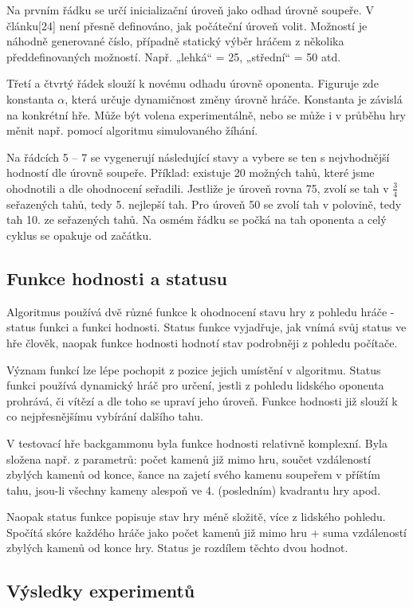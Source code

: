 Na prvním řádku se určí inicializační úroveň jako odhad úrovně soupeře. V článku[24] není přesně definováno, jak počáteční úroveň volit. Možností je náhodně generované číslo, případně statický výběr hráčem z několika předdefinovaných možností. Např. „lehká“ = 25, „střední“ = 50 atd.

Třetí a čtvrtý řádek slouží k novému odhadu úrovně oponenta. Figuruje zde konstanta $\alpha$, která určuje dynamičnost změny úrovně hráče. Konstanta je závislá na konkrétní hře. Může být volena experimentálně, nebo se může i v průběhu hry měnit např. pomocí algoritmu simulovaného žíhání.

Na řádcích 5 – 7 se vygenerují následující stavy a vybere se ten s nejvhodnější hodností dle úrovně soupeře. Příklad: existuje 20 možných tahů, které jsme ohodnotili a dle ohodnocení seřadili. Jestliže je úroveň rovna 75, zvolí se tah v $\frac{3}{4}$ seřazených tahů, tedy 5. nejlepší tah. Pro úroveň 50 se zvolí tah v polovině, tedy tah 10. ze seřazených tahů.
Na osmém řádku se počká na tah oponenta a celý cyklus se opakuje od začátku.

\subsection{Funkce hodnosti a statusu}

Algoritmus používá dvě různé funkce k ohodnocení stavu hry z pohledu hráče - status funkci a funkci hodnosti. Status funkce vyjadřuje, jak vnímá svůj status ve hře člověk, naopak funkce hodnosti hodnotí stav podrobněji z pohledu počítače. 

Význam funkcí lze lépe pochopit z pozice jejich umístění v algoritmu. Status funkci používá dynamický hráč pro určení, jestli z pohledu lidského oponenta prohrává, či vítězí a dle toho se upraví jeho úroveň. Funkce hodnosti již slouží k co nejpřesnějšímu vybírání dalšího tahu.

V testovací hře backgammonu byla funkce hodnosti relativně komplexní. Byla složena např. z parametrů: počet kamenů již mimo hru, součet vzdáleností zbylých kamenů od konce, šance na zajetí svého kamenu soupeřem v příštím tahu, jsou-li všechny kameny alespoň ve 4. (posledním) kvadrantu hry apod.

Naopak status funkce popisuje stav hry méně složitě, více z lidského pohledu. Spočítá skóre každého hráče jako počet kamenů již mimo hru + suma vzdáleností zbylých kamenů od konce hry. Status je rozdílem těchto dvou hodnot.

\subsection{Výsledky experimentů}

